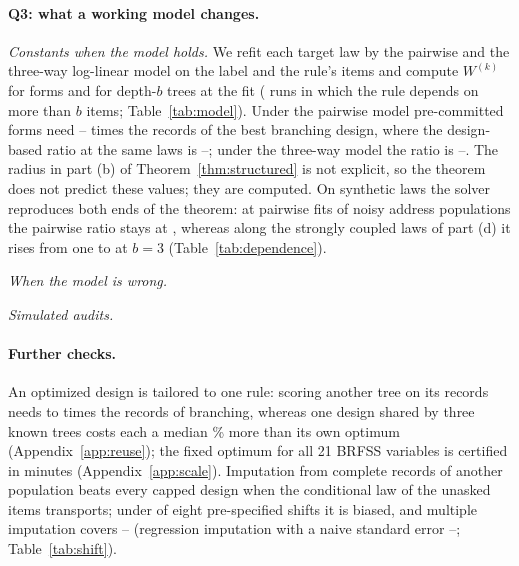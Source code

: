 

\paragraph{Q3: what a working model changes.}
\emph{Constants when the model holds.} We refit each target law by the pairwise and the three-way log-linear model on the label and the rule's items and compute $W^{(k)}$ for forms and for depth-$b$ trees at the fit (\nModelRuns{} runs in which the rule depends on more than $b$ items; Table~\ref{tab:model}). Under the pairwise model pre-committed forms need \nModelTwoLo--\nModelTwoHi{} times the records of the best branching design, where the design-based ratio at the same laws is \nModelDesignLo--\nModelDesignHi; under the three-way model the ratio is \nModelThreeLo--\nModelThreeHi. The radius in part (b) of Theorem~\ref{thm:structured} is not explicit, so the theorem does not predict these values; they are computed. On synthetic laws the solver reproduces both ends of the theorem: at pairwise fits of noisy address populations the pairwise ratio stays at \nDepFitTwoMax, whereas along the strongly coupled laws of part (d) it rises from one to \nDepRatioLast{} at $b=3$ (Table~\ref{tab:dependence}).

\emph{When the model is wrong.} \nMisspecSentence

\emph{Simulated audits.} \nAuditParagraph

\paragraph{Further checks.}
An optimized design is tailored to one rule: scoring another tree on its records needs \nReuseMin{} to \nReuseMax{} times the records of branching, whereas one design shared by three known trees costs each a median \nJointPenMed\% more than its own optimum (Appendix~\ref{app:reuse}); the fixed optimum for all 21 BRFSS variables is certified in \nScaleMin{} minutes (Appendix~\ref{app:scale}). Imputation from complete records of another population beats every capped design when the conditional law of the unasked items transports; under \nImpBadN{} of eight pre-specified shifts it is biased, and multiple imputation covers \nMiCovLo--\nMiCovHi{} (regression imputation with a naive standard error \nImpCovLo--\nImpCovHi; Table~\ref{tab:shift}).
